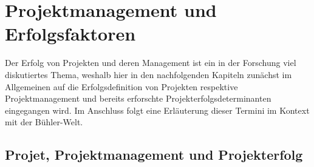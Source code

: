 \section{Projektmanagement und Erfolgsfaktoren}
	
Der Erfolg von Projekten und deren Management ist ein in der Forschung viel diskutiertes Thema, weshalb hier in den nachfolgenden Kapiteln zunächst im Allgemeinen auf die Erfolgsdefinition von Projekten respektive Projektmanagement und bereits erforschte Projekterfolgsdeterminanten eingegangen wird. Im Anschluss folgt eine Erläuterung dieser Termini im Kontext mit der Bühler-Welt.
	
\subsection{Projet, Projektmanagement und Projekterfolg}
	
